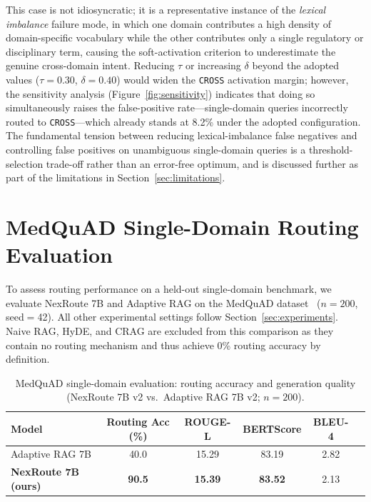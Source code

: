 \documentclass[a4paper,fleql]{cas-sc}
\begin{document}
This case is not idiosyncratic; it is a representative instance of the
\emph{lexical imbalance} failure mode, in which one domain contributes a high
density of domain-specific vocabulary while the other contributes only a single
regulatory or disciplinary term, causing the soft-activation criterion to
underestimate the genuine cross-domain intent. Reducing $\tau$ or increasing
$\delta$ beyond the adopted values ($\tau{=}0.30$, $\delta{=}0.40$) would
widen the \texttt{CROSS} activation margin; however, the sensitivity analysis
(Figure~\ref{fig:sensitivity}) indicates that doing so simultaneously raises the
false-positive rate---single-domain queries incorrectly routed to
\texttt{CROSS}---which already stands at 8.2\% under the adopted
configuration. The fundamental tension between reducing lexical-imbalance false
negatives and controlling false positives on unambiguous single-domain queries
is a threshold-selection trade-off rather than an error-free optimum, and is
discussed further as part of the limitations in Section~\ref{sec:limitations}.



\section{MedQuAD Single-Domain Routing Evaluation}
\label{app:medquad}

To assess routing performance on a held-out single-domain benchmark, we evaluate NexRoute 7B and Adaptive RAG on the MedQuAD dataset~\citep{ben2019question} ($n{=}200$, seed$=$42). All other experimental settings follow Section~\ref{sec:experiments}. Naive RAG, HyDE, and CRAG are excluded from this comparison as they contain no routing mechanism and thus achieve 0\% routing accuracy by definition.

\begin{table}[h]
\centering
\caption{MedQuAD single-domain evaluation: routing accuracy and generation quality (NexRoute 7B v2 vs.\ Adaptive RAG 7B v2; $n{=}200$).}
\label{tab:medquad}
\begin{tabular}{lccccc}
\toprule
\textbf{Model} & \textbf{Routing Acc (\%)} & \textbf{ROUGE-L} & \textbf{BERTScore} & \textbf{BLEU-4} \\
\midrule
Adaptive RAG 7B & 40.0 & 15.29 & 83.19 & 2.82 \\
\textbf{NexRoute 7B (ours)} & \textbf{90.5} & \textbf{15.39} & \textbf{83.52} & 2.13 \\
\bottomrule
\end{tabular}
\end{table}
\end{document}
